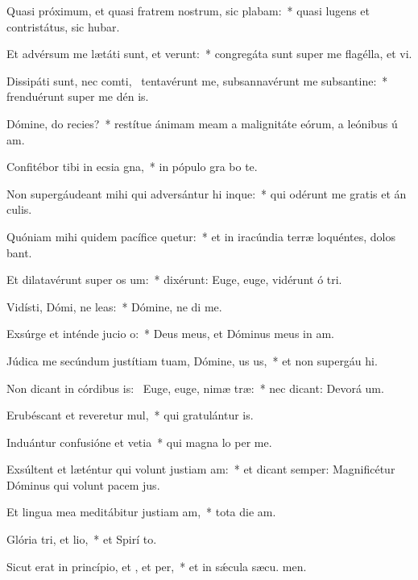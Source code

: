 \item Quasi próximum, et quasi fratrem nostrum, sic plabam:~* quasi lugens et contristátus, sic hubar.
\item Et advérsum me lætáti sunt, et verunt:~* congregáta sunt super me flagélla, et vi.
\item Dissipáti sunt, nec comti,~\pscross{} tentavérunt me, subsannavérunt me subsantine:~* frenduérunt super me dén is.
\item Dómine, do recies?~* restítue ánimam meam a malignitáte eórum, a leónibus ú am.
\item Confitébor tibi in ecsia gna,~* in pópulo gra bo te.
\item Non supergáudeant mihi qui adversántur hi inque:~* qui odérunt me gratis et án culis.
\item Quóniam mihi quidem pacífice quetur:~* et in iracúndia terræ loquéntes, dolos bant.
\item Et dilatavérunt super  os um:~* dixérunt: Euge, euge, vidérunt ó tri.
\item Vidísti, Dómi, ne leas:~* Dómine, ne di  me.
\item Exsúrge et inténde jucio o:~* Deus meus, et Dóminus meus in  am.
\item Júdica me secúndum justítiam tuam, Dómine, us us,~* et non supergáu hi.
\item Non dicant in córdibus is:~\pscross{} Euge, euge, nimæ træ:~* nec dicant: Devorá um.
\item Erubéscant et reveretur mul,~* qui gratulántur  is.
\item Induántur confusióne et vetia~* qui magna lo per me.
\item Exsúltent et læténtur qui volunt justiam am:~* et dicant semper: Magnificétur Dóminus qui volunt pacem  jus.
\item Et lingua mea meditábitur justiam am,~* tota die  am.
\item Glória tri, et lio,~* et Spirí to.
\item Sicut erat in princípio, et , et per,~* et in sǽcula sæcu. men.
